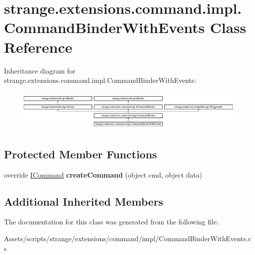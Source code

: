 \hypertarget{classstrange_1_1extensions_1_1command_1_1impl_1_1_command_binder_with_events}{\section{strange.\-extensions.\-command.\-impl.\-Command\-Binder\-With\-Events Class Reference}
\label{classstrange_1_1extensions_1_1command_1_1impl_1_1_command_binder_with_events}
}
Inheritance diagram for strange.\-extensions.\-command.\-impl.\-Command\-Binder\-With\-Events\-:\begin{figure}[H]
\begin{center}
\leavevmode
\includegraphics[height=2.040073cm]{classstrange_1_1extensions_1_1command_1_1impl_1_1_command_binder_with_events}
\end{center}
\end{figure}
\subsection*{Protected Member Functions}
\begin{DoxyCompactItemize}
\item 
\hypertarget{classstrange_1_1extensions_1_1command_1_1impl_1_1_command_binder_with_events_a6cf4f5930ded1f460e6f3094494e4a98}{override \hyperlink{interfacestrange_1_1extensions_1_1command_1_1api_1_1_i_command}{I\-Command} {\bfseries create\-Command} (object cmd, object data)}\label{classstrange_1_1extensions_1_1command_1_1impl_1_1_command_binder_with_events_a6cf4f5930ded1f460e6f3094494e4a98}

\end{DoxyCompactItemize}
\subsection*{Additional Inherited Members}


The documentation for this class was generated from the following file\-:\begin{DoxyCompactItemize}
\item 
Assets/scripts/strange/extensions/command/impl/Command\-Binder\-With\-Events.\-cs\end{DoxyCompactItemize}
